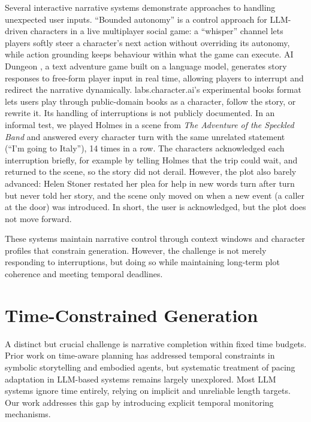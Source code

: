 Several interactive narrative systems demonstrate approaches to handling unexpected user inputs. ``Bounded autonomy'' \cite{Guo2026} is a control approach for LLM-driven characters in a live multiplayer social game: a ``whisper'' channel lets players softly steer a character's next action without overriding its autonomy, while action grounding keeps behaviour within what the game can execute. AI Dungeon \cite{hua2020playing}, a text adventure game built on a language model, generates story responses to free-form player input in real time, allowing players to interrupt and redirect the narrative dynamically. labs.character.ai's experimental books format \cite{characterai2026labs} lets users play through public-domain books as a character, follow the story, or rewrite it. Its handling of interruptions is not publicly documented. In an informal test, we played Holmes in a scene from \textit{The Adventure of the Speckled Band} and answered every character turn with the same unrelated statement (``I'm going to Italy''), 14 times in a row. The characters acknowledged each interruption briefly, for example by telling Holmes that the trip could wait, and returned to the scene, so the story did not derail. However, the plot also barely advanced: Helen Stoner restated her plea for help in new words turn after turn but never told her story, and the scene only moved on when a new event (a caller at the door) was introduced. In short, the user is acknowledged, but the plot does not move forward.

These systems maintain narrative control through context windows and character profiles that constrain generation. However, the challenge is not merely responding to interruptions, but doing so while maintaining long-term plot coherence and meeting temporal deadlines.

\section{Time-Constrained Generation}

A distinct but crucial challenge is narrative completion within fixed time budgets. Prior work on time-aware planning \cite{porteous2011controlling,CavazzaCharlesMead2001} has addressed temporal constraints in symbolic storytelling and embodied agents, but systematic treatment of pacing adaptation in LLM-based systems remains largely unexplored. Most LLM systems ignore time entirely, relying on implicit and unreliable length targets. Our work addresses this gap by introducing explicit temporal monitoring mechanisms.

